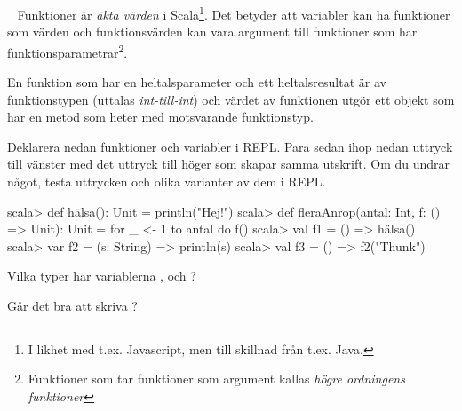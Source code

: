 \begin{ConceptConnections}

\end{ConceptConnections}

\SOLUTION

\TaskSolved \what

\begin{ConceptConnections}
  
\end{ConceptConnections}

\QUESTEND




\QUESTBEGIN

\Task  \what~  Funktioner är \emph{äkta värden} i Scala\footnote{I likhet med t.ex. Javascript, men till skillnad från t.ex. Java.}. Det betyder att variabler kan ha funktioner som värden och funktionsvärden kan vara argument till funktioner som har funktionsparametrar\footnote{Funktioner som tar funktioner som argument kallas \emph{högre ordningens funktioner}}.

  En funktion som har en heltalsparameter och ett heltalsresultat är av funktionstypen  (uttalas \emph{int-till-int}) och värdet av funktionen utgör ett objekt som har en metod som heter  med motsvarande funktionstyp.

\Subtask \label{subtask:funcval} Deklarera nedan funktioner och variabler i REPL. Para sedan ihop nedan uttryck till vänster med det uttryck till höger som skapar samma utskrift. Om du undrar något, testa uttrycken och olika varianter av dem i REPL.

\begin{REPL}
scala> def hälsa(): Unit = println("Hej!")
scala> def fleraAnrop(antal: Int, f: () => Unit): Unit =
         for _ <- 1 to antal do f()
scala> val f1 = () => hälsa()
scala> var f2 = (s: String) => println(s)
scala> val f3 = () => f2("Thunk")
\end{REPL}

\begin{ConceptConnections}

\end{ConceptConnections}


\Subtask Vilka typer har variablerna ,  och ?

\Subtask Går det bra att skriva ?

